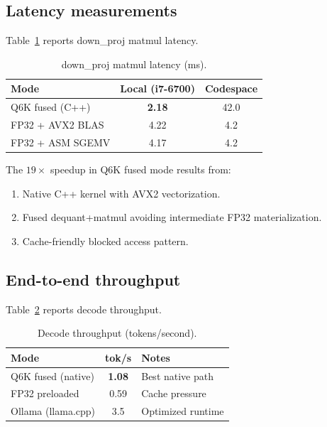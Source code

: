 \documentclass[aip,twocolumn,letterpaper]{revtex4}
\begin{document}
\subsection{Latency measurements}

Table~\ref{tab:latency} reports down\_proj matmul latency.

\begin{table}[t]
\caption{down\_proj matmul latency (ms).}
\label{tab:latency}
\begin{ruledtabular}
\begin{tabular}{lcc}
Mode & Local (i7-6700) & Codespace \\
\hline
Q6K fused (C++) & \textbf{2.18} & 42.0 \\
FP32 + AVX2 BLAS & 4.22 & 4.2 \\
FP32 + ASM SGEMV & 4.17 & 4.2 \\
\end{tabular}
\end{ruledtabular}
\end{table}

The \(19\times\) speedup in Q6K fused mode results from:
\begin{enumerate}
\item Native C++ kernel with AVX2 vectorization.
\item Fused dequant+matmul avoiding intermediate FP32 materialization.
\item Cache-friendly blocked access pattern.
\end{enumerate}

\subsection{End-to-end throughput}

Table~\ref{tab:throughput} reports decode throughput.

\begin{table}[t]
\caption{Decode throughput (tokens/second).}
\label{tab:throughput}
\begin{ruledtabular}
\begin{tabular}{lcl}
Mode & tok/s & Notes \\
\hline
Q6K fused (native) & \textbf{1.08} & Best native path \\
FP32 preloaded & 0.59 & Cache pressure \\
Ollama (llama.cpp) & 3.5 & Optimized runtime \\
\end{tabular}
\end{ruledtabular}
\end{table}
\end{document}
